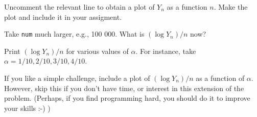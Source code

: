 \begin{exercise}
Uncomment the relevant line to obtain a plot of $Y_{n}$ as a function $n$. Make the plot and include it in your assigment.
\end{exercise}

\begin{exercise}
Take \texttt{num} much larger, e.g., 100 000. What is $(\log Y_n)/n$ now?
\end{exercise}


\begin{exercise}
Print $(\log Y_n)/n$  for various values of $\alpha$. For instance, take $\alpha = 1/10, 2/10, 3/10, 4/10$.
\end{exercise}

\begin{exercise}
If you like a simple challenge, include a plot of $(\log Y_n)/n$ as a function of $\alpha$. However, skip this if you don't have time, or interest in this extension of the problem. (Perhaps, if you find programming hard, you should do it to improve your skills :-) )
\end{exercise}



